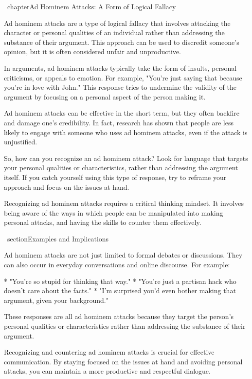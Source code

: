 \documentclass{report}%
\begin{document}
{{{%
\ chapter{Ad Hominem Attacks: A Form of Logical Fallacy}

 Ad hominem attacks are a type of logical fallacy that involves attacking the character or personal qualities of an individual rather than addressing the substance of their argument. This approach can be used to discredit someone's opinion, but it is often considered unfair and unproductive.

 In arguments, ad hominem attacks typically take the form of insults, personal criticisms, or appeals to emotion. For example, "You're just saying that because you're in love with John." This response tries to undermine the validity of the argument by focusing on a personal aspect of the person making it.

 Ad hominem attacks can be effective in the short term, but they often backfire and damage one's credibility. In fact, research has shown that people are less likely to engage with someone who uses ad hominem attacks, even if the attack is unjustified.

 So, how can you recognize an ad hominem attack? Look for language that targets your personal qualities or characteristics, rather than addressing the argument itself. If you catch yourself using this type of response, try to reframe your approach and focus on the issues at hand.

 Recognizing ad hominem attacks requires a critical thinking mindset. It involves being aware of the ways in which people can be manipulated into making personal attacks, and having the skills to counter them effectively.

\ section{Examples and Implications}

 Ad hominem attacks are not just limited to formal debates or discussions. They can also occur in everyday conversations and online discourse. For example:

*   "You're so stupid for thinking that way."
*   "You're just a partisan hack who doesn't care about the facts."
*   "I'm surprised you'd even bother making that argument, given your background."

 These responses are all ad hominem attacks because they target the person's personal qualities or characteristics rather than addressing the substance of their argument.

 Recognizing and countering ad hominem attacks is crucial for effective communication. By staying focused on the issues at hand and avoiding personal attacks, you can maintain a more productive and respectful dialogue.

}}}
\end{document}
